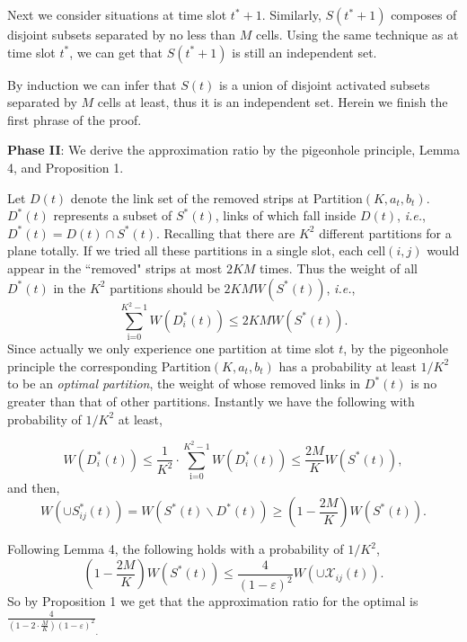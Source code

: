 \documentclass[journal]{IEEEtran}
\begin{document}
\begin{IEEEproof}
Next we consider situations at time slot $t^\ast +1$. Similarly, $S(t^\ast +1)$ composes of disjoint subsets separated by no less than  $M$ cells. Using the same technique as at time slot $t^\ast $, we can get that $S(t^\ast +1)$ is still an independent set.

By induction we can infer that $S(t)$ is a union of disjoint activated subsets separated by  $M$ cells at least, thus it is an independent set. Herein we finish the first phrase of the proof.

\textbf{Phase II}: We derive the approximation ratio by the pigeonhole principle, Lemma 4, and Proposition 1.


Let $D(t)$ denote the link set of the removed strips at Partition$(K,a_t,b_t)$. $D^\ast (t)$ represents a subset of $S^\ast (t)$, links of which fall inside $D(t)$, \emph{i.e.}, $D^\ast (t)=D(t)\cap S^\ast (t)$.  Recalling that there are $K^2$ different partitions for a plane totally.
  If we tried all these partitions in a single slot, each $\mbox{cell}(i,j)$ would appear in the ``removed" strips at most $2KM$ times. Thus the weight of all $D^\ast (t)$ in the $K^2$ partitions should be $2KM W(S^{\ast}(t))$, \emph{i.e.},
    \begin{equation} \sum\limits_{\mbox{i=0}}^{K^2-1} {W(D_i^\ast (t))} \leq {2KM}W(S^\ast (t)). \end{equation}
 Since actually we only experience one partition at time slot $t$,  by the pigeonhole principle the corresponding  Partition$(K,a_t,b_t)$ has a probability at least $1/K^2$ to be an \emph{optimal partition}, the weight of whose removed links in $D^\ast (t)$ is no greater than that of other partitions. Instantly we have the following with probability of $1/K^2$ at least,

{\small{\begin{equation}
W(D_i^\ast (t))\le \frac{1}{K^2}\cdot \sum\limits_{\mbox{i=0}}^{K^2-1}
{W(D_i^\ast (t))} \leq \frac{2M}{K}W(S^\ast (t)),
\end{equation}}}
and then,
{\small{
\begin{equation}
    W(\cup S_{ij}^\ast (t))= W(S^\ast (t)\backslash D^\ast (t))\ge (1-\frac{2M}{K})W(S^\ast (t)).
\end{equation}
}}

Following Lemma 4, the following holds with a probability of $1/K^2$,
{\small{\begin{equation}
(1-\frac{2M}{K})W(S^\ast (t))\le  \frac{4}{(1-\varepsilon )^2}W(\cup \mathcal{X}_{ij} (t)).
\end{equation}}}
So by Proposition 1 we get that the approximation ratio for the optimal is
{\small{${\frac{4}{(1-2\cdot\frac{M}{K})(1-\varepsilon )^2}}_{.}$}}
\end{IEEEproof}
\end{document}
